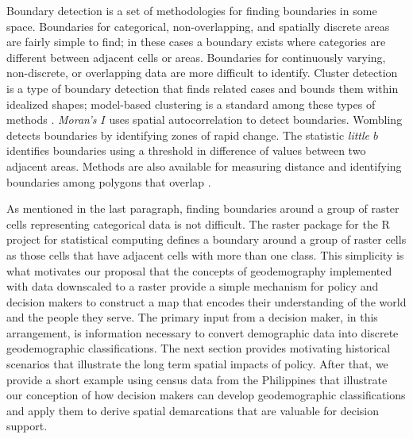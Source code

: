 \documentclass[draft]{article}
\begin{document}
Boundary detection is a set of methodologies for finding boundaries in some space.  Boundaries for categorical, non-overlapping, and spatially discrete areas are fairly simple to find; in these cases a boundary exists where categories are different between adjacent cells or areas.  Boundaries for continuously varying, non-discrete, or overlapping data are more difficult to identify.
Cluster detection is a type of boundary detection that finds related cases and bounds them within idealized shapes; model-based clustering is a standard among these types of methods \cite{fraley98, fraley02}.  {\em Moran's $I$} \cite{moran50} uses spatial autocorrelation to detect boundaries.  Wombling \cite{womble51} detects boundaries by identifying zones of rapid change.  The statistic {\em little $b$} \cite{jacquez08} identifies boundaries using a threshold in difference of values between two adjacent areas.  Methods are also available for measuring distance and identifying boundaries among polygons that overlap \cite{maruca02}.  %


As mentioned in the last paragraph, finding boundaries around a group of raster cells representing categorical data is not difficult.  The raster package for the R project for statistical computing \cite{raster} defines a boundary around a group of raster cells as those cells that have adjacent cells with more than one class.  This simplicity is what motivates our proposal that the concepts of geodemography implemented with data downscaled to a raster provide a simple mechanism for policy and decision makers to construct a map that encodes their understanding of the world and the people they serve.  The primary input from a decision maker, in this arrangement, is information necessary to convert demographic data into discrete geodemographic classifications.  The next section provides motivating historical scenarios that illustrate the long term spatial impacts of policy.  After that, we provide a short example using census data from the Philippines that illustrate our conception of how decision makers can develop geodemographic classifications and apply them to derive spatial demarcations that are valuable for decision support.
\end{document}
